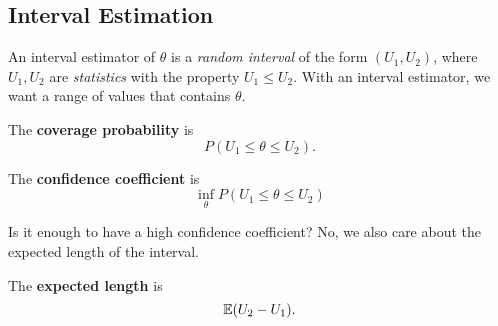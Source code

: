 \subsection{Interval Estimation}
An interval estimator of $\theta$ is a \textit{random interval} of the form $(U_1,U_2)$, where $U_1,U_2$ are \textit{statistics} with the property $U_1\leq U_2.$ With an interval estimator, we want a range of values that contains $\theta.$
\begin{definition}
The \textbf{coverage probability} is
$$
P(U_1\leq \theta\leq U_2).
$$
\end{definition}

\begin{definition}

The \textbf{confidence coefficient} is
$$
\inf_{\theta}P(U_1\leq \theta \leq U_2)
$$
\end{definition}

Is it enough to have a high confidence coefficient? No, we also care about the expected length of the interval. 

\begin{definition}
The \textbf{expected length} is 
$$
\mathbb E(U_2-U_1).
$$
\end{definition}
